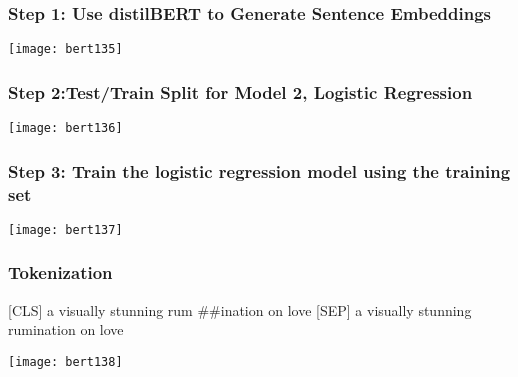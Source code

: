 \begin{frame}[fragile]\frametitle{ Step 1: Use distilBERT to Generate Sentence Embeddings}

			\begin{center}
			\texttt{[image: bert135]}
			\end{center}	


\end{frame}

\begin{frame}[fragile]\frametitle{ Step 2:Test/Train Split for Model 2, Logistic Regression}

			\begin{center}
			\texttt{[image: bert136]}
			\end{center}	


\end{frame}

\begin{frame}[fragile]\frametitle{ Step 3: Train the logistic regression model using the training set}

			\begin{center}
			\texttt{[image: bert137]}
			\end{center}	


\end{frame}

\begin{frame}[fragile]\frametitle{ Tokenization}

[CLS] a visually stunning rum \#\#ination on love [SEP]
a visually stunning rumination on love


			\begin{center}
			\texttt{[image: bert138]}
			\end{center}	


\end{frame}

